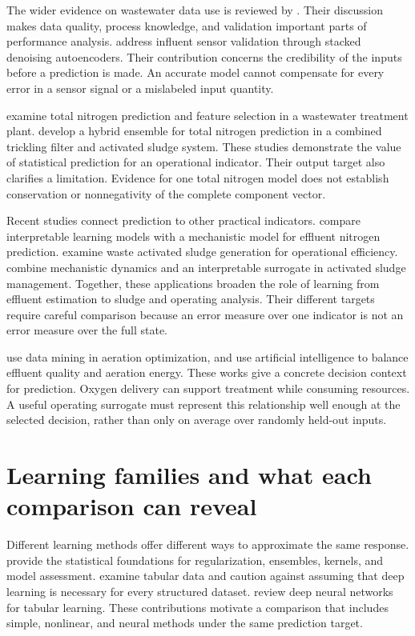 The wider evidence on wastewater data use is reviewed by \citet{Newhart2019}. Their discussion makes data quality, process knowledge, and validation important parts of performance analysis. \citet{BaAlawi2021} address influent sensor validation through stacked denoising autoencoders. Their contribution concerns the credibility of the inputs before a prediction is made. An accurate model cannot compensate for every error in a sensor signal or a mislabeled input quantity.

\citet{Bagherzadeh2021} examine total nitrogen prediction and feature selection in a wastewater treatment plant. \citet{SadriMoghaddamMesghali2023} develop a hybrid ensemble for total nitrogen prediction in a combined trickling filter and activated sludge system. These studies demonstrate the value of statistical prediction for an operational indicator. Their output target also clarifies a limitation. Evidence for one total nitrogen model does not establish conservation or nonnegativity of the complete component vector.

Recent studies connect prediction to other practical indicators. \citet{Wang2025} compare interpretable learning models with a mechanistic model for effluent nitrogen prediction. \citet{Yang2025} examine waste activated sludge generation for operational efficiency. \citet{Xiao2026} combine mechanistic dynamics and an interpretable surrogate in activated sludge management. Together, these applications broaden the role of learning from effluent estimation to sludge and operating analysis. Their different targets require careful comparison because an error measure over one indicator is not an error measure over the full state.

\citet{Asadi2017} use data mining in aeration optimization, and \citet{Mao2024} use artificial intelligence to balance effluent quality and aeration energy. These works give a concrete decision context for prediction. Oxygen delivery can support treatment while consuming resources. A useful operating surrogate must represent this relationship well enough at the selected decision, rather than only on average over randomly held-out inputs.

\section{Learning families and what each comparison can reveal}

Different learning methods offer different ways to approximate the same response. \citet{Hastie2009} provide the statistical foundations for regularization, ensembles, kernels, and model assessment. \citet{ShwartzZiv2022} examine tabular data and caution against assuming that deep learning is necessary for every structured dataset. \citet{Borisov2024} review deep neural networks for tabular learning. These contributions motivate a comparison that includes simple, nonlinear, and neural methods under the same prediction target.


